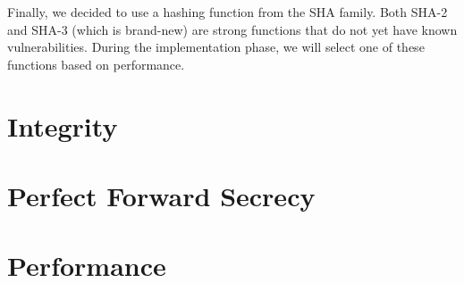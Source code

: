\documentclass[a4paper]{article}
\begin{document}
Finally, we decided to use a hashing function from the SHA family. Both SHA-2 and SHA-3 (which is brand-new) are strong functions that do not yet have known vulnerabilities. During the implementation phase, we will select one of these functions based on performance.

\section{Integrity}

\section{Perfect Forward Secrecy}

\section{Performance}
\end{document}
